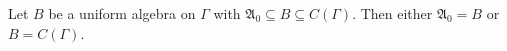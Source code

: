 
Let $B$ be a uniform algebra on $\Gamma$ with $\mathfrak{A}_0 \subseteq B \subseteq C(\Gamma)$. Then either $\mathfrak{A}_0 = B$ or $B = C(\Gamma)$.
